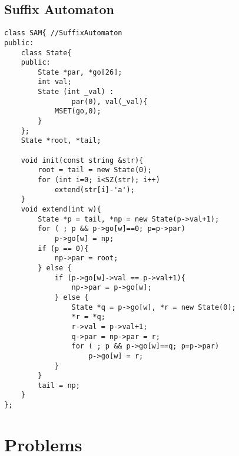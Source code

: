 \documentclass[10pt,twocolumn,oneside]{article}
\begin{document}
\subsection{Suffix Automaton}
\begin{lstlisting}
class SAM{ //SuffixAutomaton
public:
	class State{
	public:
		State *par, *go[26];
		int val;
		State (int _val) : 
				par(0), val(_val){
			MSET(go,0);
		}
	};
	State *root, *tail;
	
	void init(const string &str){
		root = tail = new State(0);
		for (int i=0; i<SZ(str); i++)
			extend(str[i]-'a');
	}
	void extend(int w){
		State *p = tail, *np = new State(p->val+1);
		for ( ; p && p->go[w]==0; p=p->par)
			p->go[w] = np;
		if (p == 0){
			np->par = root;
		} else {
			if (p->go[w]->val == p->val+1){
				np->par = p->go[w];
			} else {
				State *q = p->go[w], *r = new State(0);
				*r = *q;
				r->val = p->val+1;
				q->par = np->par = r;
				for ( ; p && p->go[w]==q; p=p->par)
					p->go[w] = r;
			}
		}
		tail = np;
	}
};
\end{lstlisting}
\newpage
\section{Problems}
\end{document}

